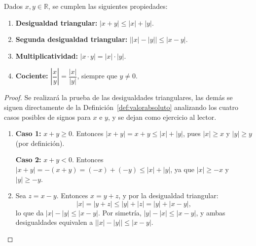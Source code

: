 \begin{theorem}\label{thm:valorabsoluto}
Dados $x, y \in \mathbb{R}$, se cumplen las siguientes propiedades:
\begin{enumerate}
   \item \textbf{Desigualdad triangular:} $|x + y| \leq |x| + |y|$.
   \item \textbf{Segunda desigualdad triangular:}
         $\bigl||x| - |y|\bigr| \leq |x - y|$.
   \item \textbf{Multiplicatividad:} $|x \cdot y| = |x| \cdot |y|$.
   \item \textbf{Cociente:} $\left|\dfrac{x}{y}\right| = \dfrac{|x|}{|y|}$,
         siempre que $y \neq 0$.
\end{enumerate}
\end{theorem}

\begin{proof} Se realizará la prueba de las desigualdades triangulares, las demás se siguen directamente de la Definición~\ref{def:valorabsoluto} analizando los cuatro casos posibles de signos para $x$ e $y$, y se dejan como ejercicio al lector.
\begin{enumerate}
\item
   \textbf{Caso 1:} $x + y \geq 0$. Entonces $|x+y| = x+y \leq |x|+|y|$,
   pues $|x| \geq x$ y $|y| \geq y$ (por definición).

   \textbf{Caso 2:} $x + y < 0$. Entonces $|x+y| = -(x+y) = (-x)+(-y) \leq
   |x|+|y|$, ya que $|x| \geq -x$ y $|y| \geq -y$.

\item
   Sea $z = x - y$. Entonces $x = y + z$, y por la desigualdad triangular:
   \[
      |x| = |y + z| \leq |y| + |z| = |y| + |x-y|,
   \]
   lo que da $|x| - |y| \leq |x-y|$. Por simetría, $|y| - |x| \leq |x-y|$, y
   ambas desigualdades equivalen a $\bigl||x|-|y|\bigr| \leq |x-y|$.
\end{enumerate}
\end{proof}

